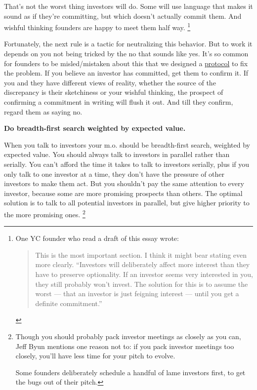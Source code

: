 That's not the worst thing investors will do. Some will use language
that makes it sound as if they're committing, but which doesn't actually
commit them. And wishful thinking founders are happy to meet them half
way. \footnote{One YC founder who read a draft of this essay wrote:

\begin{quote}
This is the most important section. I think it might bear stating even
more clearly. ``Investors will deliberately affect more interest than
they have to preserve optionality. If an investor seems very interested
in you, they still probably won't invest. The solution for this is to
assume the worst --- that an investor is just feigning interest ---
until you get a definite commitment.''
\end{quote}}

Fortunately, the next rule is a tactic for neutralizing this behavior.
But to work it depends on you not being tricked by the no that sounds
like yes. It's so common for founders to be misled/mistaken about this
that we designed a \href{http://ycombinator.com/hdp.html}{protocol} to
fix the problem. If you believe an investor has committed, get them to
confirm it. If you and they have different views of reality, whether the
source of the discrepancy is their sketchiness or your wishful thinking,
the prospect of confirming a commitment in writing will flush it out.
And till they confirm, regard them as saying no.

\textbf{Do breadth-first search weighted by expected value.}

When you talk to investors your m.o. should be breadth-first search,
weighted by expected value. You should always talk to investors in
parallel rather than serially. You can't afford the time it takes to
talk to investors serially, plus if you only talk to one investor at a
time, they don't have the pressure of other investors to make them act.
But you shouldn't pay the same attention to every investor, because some
are more promising prospects than others. The optimal solution is to
talk to all potential investors in parallel, but give higher priority to
the more promising ones. \footnote{Though you should probably pack investor meetings as closely as
you can, Jeff Byun mentions one reason not to: if you pack investor
meetings too closely, you'll have less time for your pitch to evolve.

Some founders deliberately schedule a handful of lame investors first,
to get the bugs out of their pitch.}

